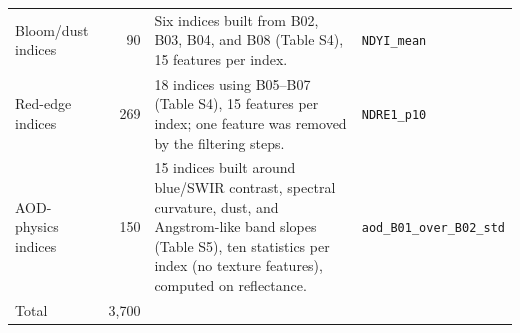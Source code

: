 \documentclass[draft,ea]{agutexSI2019}
\begin{document}
\begin{table}
\begin{tabular}{p{} r p{} p{}}
Bloom/dust indices & 90 & Six indices built from B02, B03, B04, and B08 (Table S4), 15 features per index. & \texttt{NDYI\_mean} \\
Red-edge indices & 269 & 18 indices using B05--B07 (Table S4), 15 features per index; one feature was removed by the filtering steps. & \texttt{NDRE1\_p10} \\
AOD-physics indices & 150 & 15 indices built around blue/SWIR contrast, spectral curvature, dust, and Angstrom-like band slopes (Table S5), ten statistics per index (no texture features), computed on reflectance. & \texttt{aod\_B01\_over\_B02\_std} \\
\hline
Total & 3,700 & & \\
\hline
\end{tabular}
\end{table}
\end{document}
